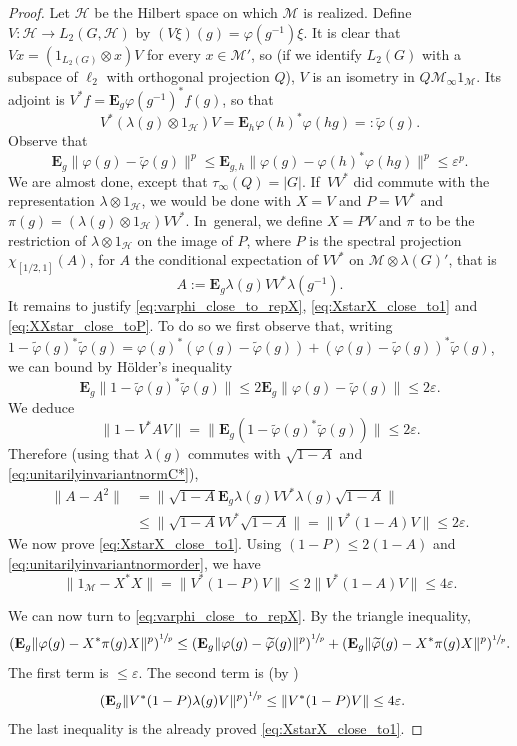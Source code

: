 \documentclass[JEP,XML,SOM,Unicode,published]{cedram}
\theoremstyle{plain}
\theoremstyle{definition}
\newcommand{\cM}{\mathcal{M}}
\newcommand{\E}{\mathbf{E}}
\newcommand{\cH}{\mathcal{H}}
\begin{document}
\begin{proof} Let $\cH$ be the Hilbert space on which $\cM$ is realized. Define $V \colon \cH \to L_2(G,\cH)$ by $(V\xi)(g) = \varphi(g^{-1})\xi$. It is clear that $V x= (1_{L_2(G)}\otimes x) V$ for every $x \in \cM'$, so (if we identify $L_2(G)$ with a subspace of $\ell_2$ with orthogonal projection $Q$), $V$ is an isometry in $Q \cM_\infty 1_\cM$. Its adjoint is $V^*f = \E_g \varphi(g^{-1})^* f(g)$, so that
\[
V^* (\lambda(g)\otimes 1_\cH) V = \E_h \varphi(h)^* \varphi(h g)=: \tilde \varphi(g).
\]
Observe that
\[
\E_g \|\varphi(g) - \tilde\varphi(g)\|^p \leq \E_{g,h} \|\varphi(g) - \varphi(h)^* \varphi(hg)\|^p \leq \varepsilon^p.
\]
We are almost done, except that $\tau_\infty(Q) = |G|$. If~$VV^*$ did commute with the representation $\lambda\otimes 1_\cH$, we would be done with $X=V$ and $P=VV^*$ and $\pi(g)= (\lambda(g)\otimes 1_\cH) VV^*$. In~general, we define $X=PV$ and $\pi$ to be the restriction of $\lambda \otimes 1_{\cH}$ on the image of $P$, where $P$ is the spectral projection $\chi_{[1/2,1]}(A)$, for $A$ the conditional expectation of $VV^*$ on $\cM \otimes \lambda(G)'$, that is
\[
A:= \E_g \lambda(g) VV^* \lambda(g^{-1}).
\]
It remains to justify \eqref{eq:varphi_close_to_repX}, \eqref{eq:XstarX_close_to1} and \eqref{eq:XXstar_close_toP}. To do so we first observe that, writing $1-\tilde{\varphi}(g)^* \tilde\varphi(g) = \varphi(g)^*(\varphi(g) - \tilde{\varphi}(g)) + (\varphi(g) - \tilde{\varphi}(g))^* \tilde{\varphi}(g)$, we can bound by Hölder's inequality
\begin{equation}\label{eq:tildevarphi_close_to_1} \E_g \|1-\tilde{\varphi}(g)^* \tilde\varphi(g)\| \leq 2\E_g \|\varphi(g) - \tilde{\varphi}(g)\| \leq 2{\varepsilon}.
\end{equation}
We deduce
\[
\| 1-V^*A V\| = \|\E_g (1-\tilde\varphi (g)^*\tilde\varphi(g))\| \leq 2{\varepsilon}.
\]
Therefore (using that $\lambda(g)$ commutes with $\sqrt{1-A}$ and \eqref{eq:unitarilyinvariantnormC*}),
\begin{align*} \|A - A^2\| &= \| \sqrt{1-A} \E_g \lambda(g) VV^* \lambda(g) \sqrt{1-A}\|\\
& \leq \| \sqrt{1-A} V V^* \sqrt{1-A}\| = \|V^*(1-A) V\| \leq 2{\varepsilon}.
\end{align*}
We now prove \eqref{eq:XstarX_close_to1}. Using $(1-P) \leq 2(1-A)$ and \eqref{eq:unitarilyinvariantnormorder}, we have
\[
\|1_\cM - X^*X\| = \|V^*(1-P)V\| \leq 2 \|V^* (1-A) V\| \leq 4 {\varepsilon}.
\]

We can now turn to \eqref{eq:varphi_close_to_repX}. By the triangle inequality,
\[
\left(\E_g \|\varphi(g)-X^* \pi(g) X\|^p\right)^{\sfrac 1 p}\leq \left(\E_g \|\varphi(g)-\widetilde{\varphi}(g)\|^p\right)^{\sfrac 1 p} +(\E_g \|\widetilde \varphi(g)-X^* \pi(g) X\|^p)^{\sfrac 1 p}.
\]
The first term is $\leq \varepsilon$. The second term is (by \cite[Cor.\,2.8]{MR3867328})
\begin{align*} \left(\E_g \|V^*(1-P) \lambda(g)V\|^p\right)^{\sfrac 1 p} & \leq \|V^*(1-P)V\| \leq 4\varepsilon.
\end{align*}
The last inequality is the already proved \eqref{eq:XstarX_close_to1}.


\end{proof}
\end{document}
